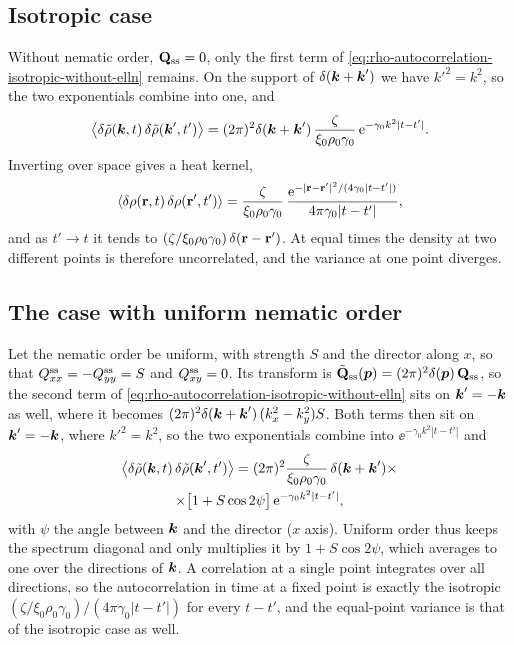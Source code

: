 \documentclass[aps,pre,reprint,superscriptaddress,longbibliography,nofootinbib
]{revtex4-2}
\begin{document}
\subsection{Isotropic case}
\label{app:variance-iso}
Without nematic order, $\Q_\ss=0$, only the first term of
\cref{eq:rho-autocorrelation-isotropic-without-elln}
remains. On the support of $\delta(\k+\k')$ we have
$k'^2=k^2$, so the two exponentials combine into one, and
\begin{equation}
  \la\delta\tilde\rho(\k,t)\,\delta\tilde\rho(\k',t')\ra=(2\pi)^2\delta(\k+\k')\,
  \frac{\zeta}{\xi_0\rho_0\gamma_0}\,\ee^{-\gamma_0k^2|t-t'|}.
\end{equation}
Inverting over space gives a heat kernel,
\begin{equation}
  \label{eq:rho-correlation-no-cutoff}
  \la\delta\rho(\r,t)\,\delta\rho(\r',t')\ra=\frac{\zeta}{\xi_0\rho_0\gamma_0}\,
  \frac{\ee^{-|\r-\r'|^2/(4\gamma_0|t-t'|)}}{4\pi\gamma_0|t-t'|},
\end{equation}
and as $t'\to t$ it tends to
$(\zeta/\xi_0\rho_0\gamma_0)\,\delta(\r-\r')$. At equal
times the density at two different points is therefore
uncorrelated, and the variance at one point diverges.

\subsection{The case with uniform nematic order}
\label{app:variance-uniform}
Let the nematic order be uniform, with strength $S$ and the
director along $x$, so that $Q^\ss_{xx}=-Q^\ss_{yy}=S$ and
$Q^\ss_{xy}=0$. Its transform is $\tilde\Q_\ss(\bs
p)=(2\pi)^2\delta(\bs p)\,\Q_\ss$, so the second term of
\cref{eq:rho-autocorrelation-isotropic-without-elln} sits
on $\k'=-\k$ as well, where it becomes
$(2\pi)^2\delta(\k+\k')\,(k_x^2-k_y^2)S$. Both terms then
sit on $\k'=-\k$, where $k'^2=k^2$, so the two exponentials
combine into $\ee^{-\gamma_0k^2|t-t'|}$ and
\begin{multline}
  \label{eq:rho-spectrum-uniform}
  \la\delta\tilde\rho(\k,t)\,\delta\tilde\rho(\k',t')\ra
  =(2\pi)^2\frac{\zeta}{\xi_0\rho_0\gamma_0}\,\delta(\k+\k')\times
  \\
  \times\bigl[1+S\cos2\psi\bigr]\,\ee^{-\gamma_0k^2|t-t'|},
\end{multline}
with $\psi$ the angle between $\k$ and the director ($x$
axis). Uniform order thus keeps the spectrum diagonal and
only multiplies it by $1+S\cos2\psi$, which averages to one
over the directions of $\k$. A correlation at a single
point integrates over all directions, so the
autocorrelation in time at a fixed point is exactly the
isotropic
$(\zeta/\xi_0\rho_0\gamma_0)/(4\pi\gamma_0|t-t'|)$ for
every $t-t'$, and the equal-point variance is that of the
isotropic case as well.
\end{document}
